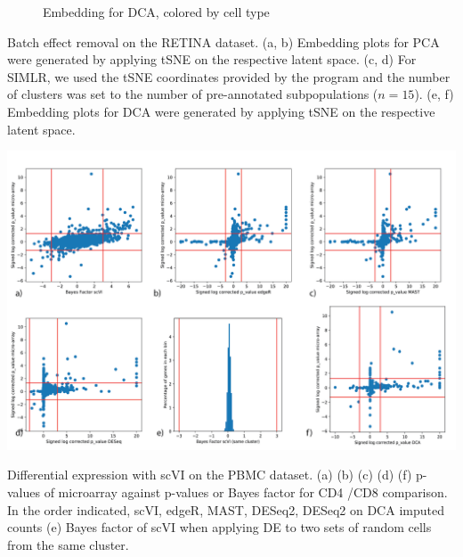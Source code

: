 \begin{suppfigure}[htp]
\begin{subfigure}[b]{0.3\textwidth}
        \caption{Embedding for DCA, colored by cell type}
    \end{subfigure}
  \caption[Batch effect removal on the RETINA dataset]{Batch effect removal on the RETINA dataset. (a, b) Embedding plots for PCA were generated by applying tSNE on the respective latent space. (c, d) For SIMLR, we used the tSNE coordinates provided by the program and the number of clusters was set to the number of pre-annotated subpopulations ($n=15$). (e, f) Embedding plots for DCA were generated by applying tSNE on the respective latent space.}
  \label{scviMNNfigure}
\end{suppfigure}


\begin{suppfigure}
\centering
\includegraphics[width=\textwidth]{figures/de_figure.png}
\caption[Differential expression with scVI on the PBMC dataset]{Differential expression with scVI on the PBMC dataset. (a) (b) (c) (d) (f) p-values of microarray against p-values or Bayes factor for CD4 /CD8 comparison. In the order indicated, scVI, edgeR, MAST, DESeq2, DESeq2 on DCA imputed counts (e) Bayes factor of scVI when applying DE to two sets of random cells from the same cluster.}
\label{scvibayes_supp}
\end{suppfigure}

